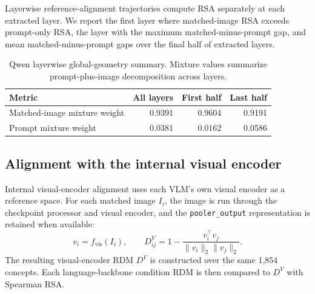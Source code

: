 \documentclass{article}
\begin{document}
Layerwise reference-alignment trajectories compute RSA separately at each extracted layer. We report the first layer where matched-image RSA exceeds prompt-only RSA, the layer with the maximum matched-minus-prompt gap, and mean matched-minus-prompt gaps over the final half of extracted layers.

\begin{table}[!htbp]
\centering
\caption{Qwen layerwise global-geometry summary. Mixture values summarize prompt-plus-image decomposition across layers.}
\label{tab:appendix_layerwise_global_local}
\small
\begin{tabular}{lrrr}
\toprule
Metric & All layers & First half & Last half \\
\midrule
Matched-image mixture weight & 0.9391 & 0.9604 & 0.9191 \\
Prompt mixture weight & 0.0381 & 0.0162 & 0.0586 \\
\bottomrule
\end{tabular}
\end{table}

\subsection{Alignment with the internal visual encoder}

Internal visual-encoder alignment uses each VLM's own visual encoder as a reference space. For each matched image \(I_i\), the image is run through the checkpoint processor and visual encoder, and the \texttt{pooler\_output} representation is retained when available:
\begin{equation}
  v_i=f_{\mathrm{vis}}(I_i), \qquad
  D^V_{ij}=1-\frac{v_i^\top v_j}{\|v_i\|_2\|v_j\|_2}.
  \label{eq:appendix_visual_encoder_rdm}
\end{equation}
The resulting visual-encoder RDM \(D^V\) is constructed over the same 1,854 concepts. Each language-backbone condition RDM is then compared to \(D^V\) with Spearman RSA.
\end{document}

